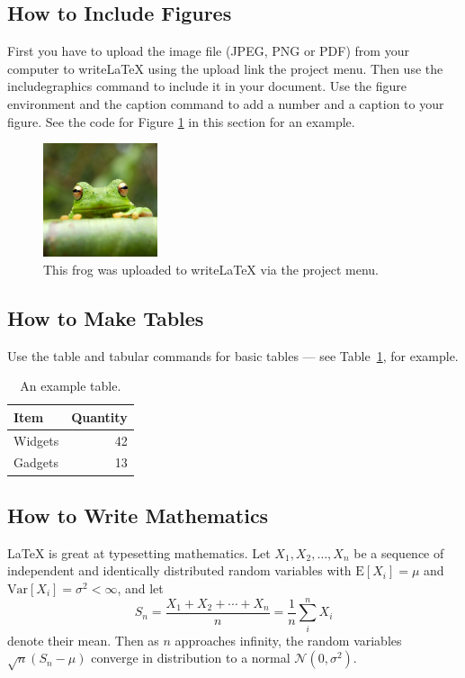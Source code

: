 \documentclass[a4paper]{article}
\begin{document}
\subsection{How to Include Figures}

First you have to upload the image file (JPEG, PNG or PDF) from your computer to writeLaTeX using the upload link the project menu. Then use the includegraphics command to include it in your document. Use the figure environment and the caption command to add a number and a caption to your figure. See the code for Figure \ref{fig:frog} in this section for an example.

\begin{figure}
\centering
\includegraphics[width=0.3\textwidth]{frog.jpg}
\caption{\label{fig:frog}This frog was uploaded to writeLaTeX via the project menu.}
\end{figure}

\subsection{How to Make Tables}

Use the table and tabular commands for basic tables --- see Table~\ref{tab:widgets}, for example.

\begin{table}
\centering
\begin{tabular}{l|r}
Item & Quantity \\\hline
Widgets & 42 \\
Gadgets & 13
\end{tabular}
\caption{\label{tab:widgets}An example table.}
\end{table}

\subsection{How to Write Mathematics}

\LaTeX{} is great at typesetting mathematics. Let $X_1, X_2, \ldots, X_n$ be a sequence of independent and identically distributed random variables with $\text{E}[X_i] = \mu$ and $\text{Var}[X_i] = \sigma^2 < \infty$, and let
$$S_n = \frac{X_1 + X_2 + \cdots + X_n}{n}
      = \frac{1}{n}\sum_{i}^{n} X_i$$
denote their mean. Then as $n$ approaches infinity, the random variables $\sqrt{n}(S_n - \mu)$ converge in distribution to a normal $\mathcal{N}(0, \sigma^2)$.
\end{document}

